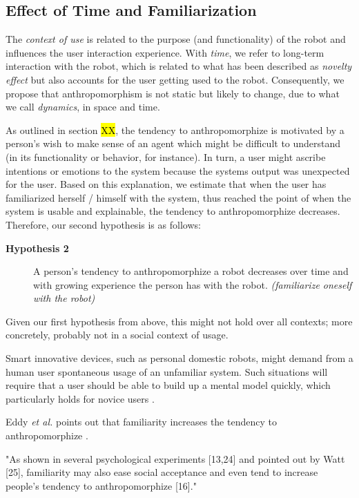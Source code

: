 \documentclass[lettersize, apacite, twoside, HRI]{apa_HRI}
\begin{document}
\subsection{Effect of Time and Familiarization}
\label{sec:8.2}

	The \textit{context of use} is related to the purpose (and functionality) of the robot and influences the user interaction experience. With \textit{time}, we refer to long-term interaction with the robot, which is related to what has been described as \textit{novelty effect} but also accounts for the user getting used to the robot. Consequently, we propose that anthropomorphism is not static but likely to change, due to what we call \textit{dynamics}, in space and time.


	As outlined in section \hl{XX}, the tendency to anthropomorphize is motivated by a person's wish to make sense of an agent which might be difficult to understand (in its functionality or behavior, for instance). In turn, a user might ascribe intentions or emotions to the system because the systems output was unexpected for the user. Based on this explanation, we estimate that when the user has familiarized herself / himself with the system, thus reached the point of when the system is usable and explainable, the tendency to anthropomorphize decreases. Therefore, our second hypothesis is as follows: 

\begin{description}
	\item[\textbf{Hypothesis 2}] A person's tendency to anthropomorphize a robot decreases over time and with growing experience the person has with the robot. \textit{(familiarize oneself with the robot)}
\end{description}	
	

Given our first hypothesis from above, this might not hold over all contexts; more concretely, probably not in a social context of usage.


	Smart innovative devices, such as personal domestic robots, might demand from a human user spontaneous usage of an unfamiliar system. Such situations will require that a user should be able to build up a mental model quickly, which particularly holds for novice users \cite{schmitz_concepts_2011}.

	Eddy \textit{et al.} points out that familiarity increases the tendency to anthropomorphize \cite{eddy_attribution_1993}.

	"As shown in several psychological experiments [13,24] and pointed out by Watt [25], familiarity may also ease social acceptance and even tend to increase people's tendency to anthropomorphize [16]." \cite{duffy_anthropomorphism_2003}
\end{document}
